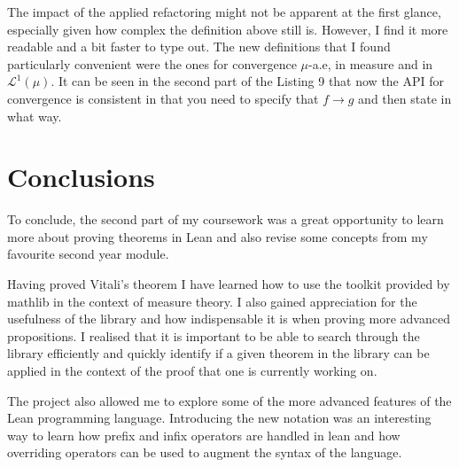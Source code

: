 \documentclass[11pt]{article}
\newcommand\Lmu{\mathcal{L}^1(\mu)}
\begin{document}
The impact of the applied refactoring might not be apparent at the first glance,
especially given how complex the definition above still is. However, I find it
more readable and a bit faster to type out. The new definitions that I
found particularly convenient were the ones for convergence $\mu$-a.e, in measure
and in  $\Lmu$. It can be seen in the second part of the Listing 9 that now the
API for convergence is consistent in that you need to specify that $f \to g$ and
then state in what way.


\section*{Conclusions}

To conclude, the second part of my coursework was a great opportunity to learn
more about proving theorems in Lean and also revise some concepts from my
favourite second year module.

Having proved Vitali's theorem I have learned
how to use the toolkit provided by mathlib in the context of measure theory. I also
gained appreciation for the usefulness of the library and how indispensable it
is when proving more advanced propositions. I realised that it is important to be
able to search through the library efficiently and quickly identify if a given
theorem in the library can be applied in the context of the proof that one is
currently working on.

The project also allowed me to explore some of the more advanced features of the
Lean programming language. Introducing the new notation was an interesting way to
learn how prefix and infix operators are handled in lean and how overriding operators
can be used to augment the syntax of the language.

\begin{comment}

-- Good example of notation refactoring

\end{comment}
\end{document}
